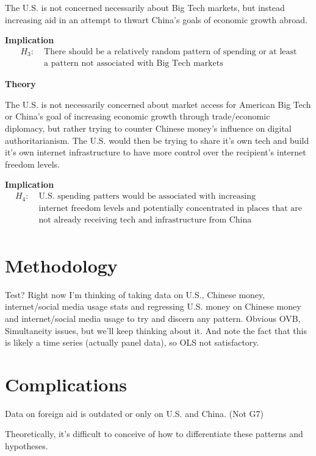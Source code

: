 \documentclass{article}
\begin{document}
The U.S. is not concerned necessarily about Big Tech markets, but instead increasing aid in an attempt to thwart China's goals of economic growth abroad.

\textbf{Implication}
\begin{align*}
    H_3:\; & \text{There should be a relatively random pattern of spending or at least}\\
    & \text{a pattern not associated with Big Tech markets}
\end{align*}

\textbf{Theory}

The U.S. is not necessarily concerned about market access for American Big Tech or China's goal of increasing economic growth through trade/economic diplomacy, but rather trying to counter Chinese money's influence on digital authoritarianism. The U.S. would then be trying to share it's own tech and build it's own internet infrastructure to have more control over the recipient's internet freedom levels.

\textbf{Implication}
\begin{align*}
    H_4:\; & \text{U.S. spending patters would be associated with increasing}\\
    & \text{internet freedom levels and potentially concentrated in places that are}\\
    & \text{not already receiving tech and infrastructure from China}\\
\end{align*}

\section*{Methodology}
Test? Right now I'm thinking of taking data on U.S., Chinese money, internet/social media usage stats and regressing U.S. money on Chinese money and internet/social media usage to try and discern any pattern. Obvious OVB, Simultaneity issues, but we'll keep thinking about it. And note the fact that this is likely a time series (actually panel data), so OLS not satisfactory.

\section*{Complications}
Data on foreign aid is outdated or only on U.S. and China. (Not G7)

Theoretically, it's difficult to conceive of how to differentiate these patterns and hypotheses. 
\end{document}
